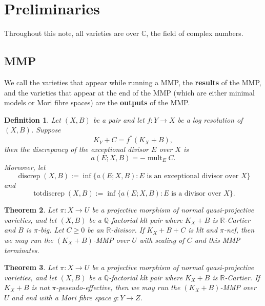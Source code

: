 \documentclass[11pt]{amsart}
\newtheorem{defn}{Definition}[section]
\newtheorem{thm}[defn]{Theorem}
\begin{document}
\section{Preliminaries}
Throughout this note, all varieties are over $\mathbb{C}$, the field of complex numbers.
\subsection{MMP}
We call the varieties that appear while running a MMP, the \textbf{results} of the MMP, and the varieties that appear at the end of the MMP (which are either minimal models or Mori fibre spaces) are the \textbf{outputs}  of the MMP. 
\begin{defn}
  Let $(X,B)$ be a pair  and let  $f:Y\to X$ be a log resolution of $(X,B)$. Suppose
  \[
  K_{Y}+C=f^*(K_{X}+B)
  ,\]
then the discrepancy  of the exceptional divisor $E$ over $X$ is
\[
  a(E;X,B)=-\operatorname{mult}_{E}C
.\]
 Moreover, let
\[
  \operatorname{discrep}(X, B) := \operatorname{inf}\{a(E; X, B) : E \text{ is an exceptional divisor over } X \}
\]
and
\[
  \operatorname{totdiscrep}(X, B) :=\operatorname{inf}\{a(E; X, B) : E \text{ is a divisor over } X\}.
\]
\end{defn}

\begin{thm}
\cite[Corollary 1.4.2]{BCHM10} Let $ \pi:X\to U $ be a projective morphism of normal quasi-projective varieties, and let $(X,B)$ be a $\mathbb{Q}$-factorial klt pair where $K_{X}+B$ is $\mathbb{R}$-Cartier and $B$ is $\pi$-big. Let $C\geqslant0$ be an $\mathbb{R}$-divisor. If $K_{X}+B+C$ is klt and  $\pi$-nef, then we may run the $(K_{X}+B)$-MMP over $U$  with scaling of $C$ and this MMP terminates.
\end{thm}

\begin{thm}\label{notpseudoeffmfs}
  \cite[Corollary 1.3.3]{BCHM10} Let $ \pi:X\to U $ be a projective morphism of normal quasi-projective varieties, and let $(X,B)$ be a $\mathbb{Q}$-factorial klt pair where $K_{X}+B$ is $\mathbb{R}$-Cartier.  If $K_{X}+B$ is  not $\pi$-peseudo-effective, then we may run the $(K_{X}+B)$-MMP over  $U$  and end with a Mori fibre space $g:Y\to Z$.
\end{thm}
\end{document}
